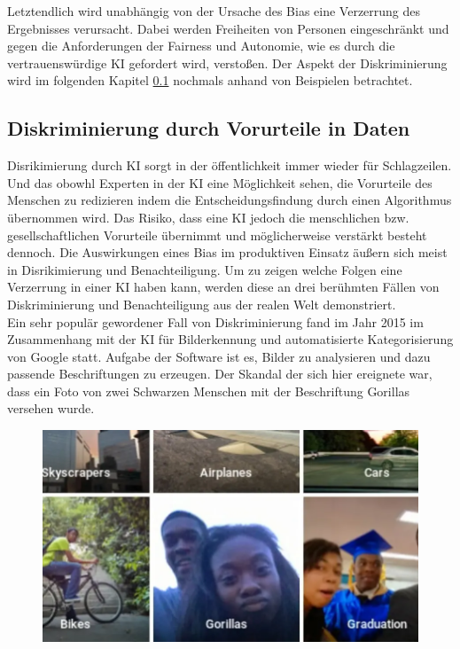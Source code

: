 \begin{onehalfspace}
        Letztendlich wird unabhängig von der Ursache des Bias eine Verzerrung des Ergebnisses verursacht. Dabei werden Freiheiten von Personen eingeschränkt und gegen die Anforderungen der Fairness und Autonomie, wie es durch die vertrauenswürdige \ac*{KI} gefordert wird, verstoßen. Der Aspekt der Diskriminierung wird im folgenden Kapitel \ref*{subsubsec:diskriminierungdurchverzerrung} nochmals anhand von Beispielen  betrachtet. 
        \\
        \cite{HEGKI2019Definition}\cite{Fabi2022}\cite{silberg2019notes}\cite{srinivasan2021biases}\cite{ntoutsi2020bias}\cite{Mehrabi2021}\cite{Parkavi2018}

    \subsection{Diskriminierung durch Vorurteile in Daten}
    \label{subsubsec:diskriminierungdurchverzerrung}
        Disrikimierung durch \ac*{KI} sorgt in der öffentlichkeit immer wieder für Schlagzeilen.\cite{Cremers2019} Und das obowhl Experten in der \ac*{KI} eine Möglichkeit sehen, die Vorurteile des Menschen zu redizieren indem die Entscheidungsfindung durch einen Algorithmus übernommen wird. Das Risiko, dass eine \ac*{KI} jedoch die menschlichen bzw. gesellschaftlichen Vorurteile übernimmt und möglicherweise verstärkt besteht dennoch.\cite{silberg2019notes} Die Auswirkungen eines Bias im produktiven Einsatz äußern sich meist in Disrikimierung und Benachteiligung. 
        Um zu zeigen welche Folgen eine Verzerrung in einer \ac*{KI} haben kann, werden diese an drei berühmten Fällen von Diskriminierung und Benachteiligung aus der realen Welt demonstriert.
        \\
        Ein sehr populär gewordener Fall von Diskriminierung fand im Jahr 2015 im Zusammenhang mit der \ac*{KI} für Bilderkennung und automatisierte Kategorisierung von Google statt. Aufgabe der Software ist es, Bilder zu analysieren und dazu passende Beschriftungen zu erzeugen. Der Skandal der sich hier ereignete war, dass ein Foto von zwei Schwarzen Menschen mit der Beschriftung \glqq{}Gorillas\grqq{} versehen wurde.\cite{Cremers2019}\cite{IncidentDatabase2015_16}
        \begin{figure}[h]
            \centering
            \includegraphics[width = 11.5cm]{Bilder/Gorillas.png}

\end{figure}
\end{onehalfspace}

